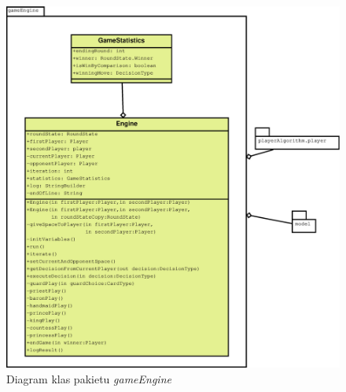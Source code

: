 \begin{figure}[H]
	\centering
	\includegraphics[width=\textwidth]{Resources/diagramKlas_engine.eps}
	\caption{Diagram klas pakietu \textit{gameEngine}} 
	\label{fig:diagramKlasEngine}
\end{figure}


